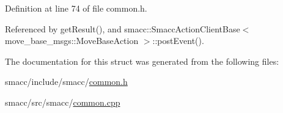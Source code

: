 Definition at line 74 of file common.\+h.



Referenced by get\+Result(), and smacc\+::\+Smacc\+Action\+Client\+Base$<$ move\+\_\+base\+\_\+msgs\+::\+Move\+Base\+Action $>$\+::post\+Event().



The documentation for this struct was generated from the following files\+:\begin{DoxyCompactItemize}
\item 
smacc/include/smacc/\hyperlink{common_8h}{common.\+h}\item 
smacc/src/smacc/\hyperlink{common_8cpp}{common.\+cpp}\end{DoxyCompactItemize}
